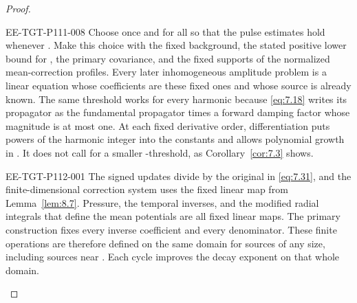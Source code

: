 \begin{proof}
\begin{EESegment}{EE-TGT-P111-008}
Choose  once and for all so that the pulse estimates
hold whenever . Make this choice with the fixed
background, the stated positive lower bound for , the primary
covariance, and the fixed supports of the normalized mean-correction profiles. Every later
inhomogeneous amplitude problem is a linear equation whose coefficients are these fixed ones and
whose source is already known. The same threshold works for every harmonic because
\eqref{eq:7.18} writes its propagator as the fundamental propagator times a forward damping
factor whose magnitude is at most one. At each
%
fixed derivative order, differentiation puts powers of the harmonic integer into the constants and
allows polynomial growth in . It does not call for a smaller
-threshold, as Corollary~\ref{cor:7.3} shows.
\end{EESegment}

\begin{EESegment}{EE-TGT-P112-001}
The signed updates divide by the original  in
\eqref{eq:7.31}, and the finite-dimensional correction system uses the fixed linear map from
Lemma~\ref{lem:8.7}. Pressure, the temporal inverses, and the modified radial integrals that define
the mean potentials are all fixed linear maps. The primary construction fixes every inverse
coefficient and every denominator. These finite operations are therefore defined on the same
domain for sources of any size, including sources near
. Each cycle improves the decay exponent on that whole
domain.
\end{EESegment}


\end{proof}
